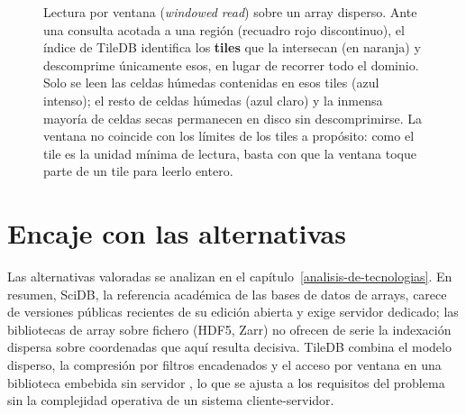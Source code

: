 \begin{figure}[ht]
\caption{Lectura por ventana (\textit{windowed read}) sobre un array disperso. Ante una consulta acotada a una región (recuadro rojo discontinuo), el índice de TileDB identifica los \textbf{tiles} que la intersecan (en naranja) y descomprime únicamente esos, en lugar de recorrer todo el dominio. Solo se leen las celdas húmedas contenidas en esos tiles (azul intenso); el resto de celdas húmedas (azul claro) y la inmensa mayoría de celdas secas permanecen en disco sin descomprimirse. La ventana no coincide con los límites de los tiles a propósito: como el tile es la unidad mínima de lectura, basta con que la ventana toque parte de un tile para leerlo entero.}
\label{fig:windowed-read}
\end{figure}

\section{Encaje con las alternativas}\label{h-alternativas}

Las alternativas valoradas se analizan en el capítulo~\ref{analisis-de-tecnologias}. En resumen, SciDB, la referencia académica de las bases de datos de arrays, carece de versiones públicas recientes de su edición abierta y exige servidor dedicado; las bibliotecas de array sobre fichero (HDF5, Zarr) no ofrecen de serie la indexación dispersa sobre coordenadas que aquí resulta decisiva. TileDB combina el modelo disperso, la compresión por filtros encadenados y el acceso por ventana en una biblioteca embebida sin servidor \cite{tiledb_github}, lo que se ajusta a los requisitos del problema sin la complejidad operativa de un sistema cliente-servidor.
